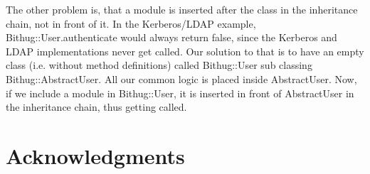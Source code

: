 \documentclass{llncs}
\begin{document}
The other problem is, that a module is inserted after the class in the inheritance chain, not in front of it. In the Kerberos/LDAP
example, Bithug::User.authenticate would always return false, since the Kerberos and LDAP implementations never get called. Our
solution to that is to have an empty class (i.e. without method definitions) called Bithug::User sub classing Bithug::AbstractUser.
All our common logic is placed inside AbstractUser. Now, if we include a module in Bithug::User, it is inserted in front of AbstractUser
in the inheritance chain, thus getting called.

\section*{Acknowledgments}


\clearpage
\end{document}
